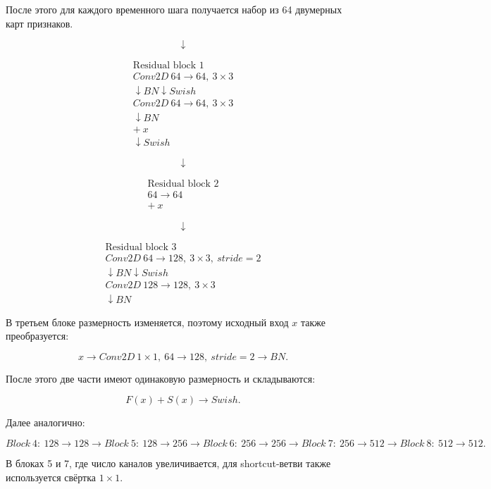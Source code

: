 \documentclass[12pt,a4paper]{article}
\begin{document}
После этого для каждого временного шага получается набор из
64 двумерных карт признаков.

\[
\downarrow
\]

\[
\boxed{
\begin{array}{c}
\text{Residual block 1} \\
Conv2D\ 64\rightarrow64,\ 3\times3 \\
\downarrow BN \downarrow Swish \\
Conv2D\ 64\rightarrow64,\ 3\times3 \\
\downarrow BN \\
+\ x \\
\downarrow Swish
\end{array}
}
\]

\[
\downarrow
\]

\[
\boxed{
\begin{array}{c}
\text{Residual block 2} \\
64 \rightarrow 64 \\
+\ x
\end{array}
}
\]

\[
\downarrow
\]

\[
\boxed{
\begin{array}{c}
\text{Residual block 3} \\
Conv2D\ 64\rightarrow128,\ 3\times3,\ stride=2 \\
\downarrow BN \downarrow Swish \\
Conv2D\ 128\rightarrow128,\ 3\times3 \\
\downarrow BN
\end{array}
}
\]

В третьем блоке размерность изменяется, поэтому исходный вход $x$
также преобразуется:

\[
x
\rightarrow
Conv2D\ 1\times1,\ 64\rightarrow128,\ stride=2
\rightarrow
BN.
\]

После этого две части имеют одинаковую размерность и складываются:

\[
F(x) + S(x)
\rightarrow
Swish.
\]

Далее аналогично:

\[
\boxed{Block~4:\ 128\rightarrow128}
\rightarrow
\boxed{Block~5:\ 128\rightarrow256}
\rightarrow
\boxed{Block~6:\ 256\rightarrow256}
\rightarrow
\boxed{Block~7:\ 256\rightarrow512}
\rightarrow
\boxed{Block~8:\ 512\rightarrow512}.
\]

В блоках 5 и 7, где число каналов увеличивается,
для shortcut-ветви также используется свёртка $1\times1$.
\end{document}
